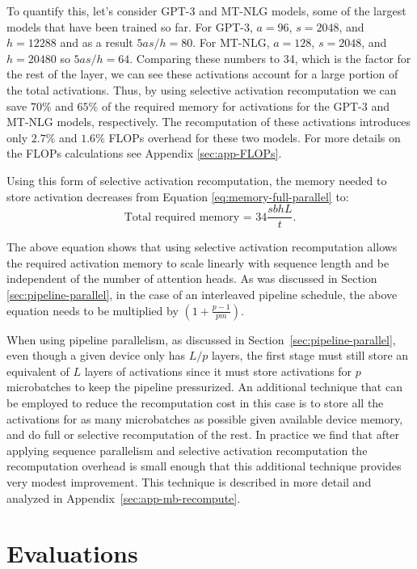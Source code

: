 \documentclass{article}
\begin{document}
To quantify this, let's consider GPT-3 \cite{gpt-3} and MT-NLG \cite{mt-nlg} models, some of the largest models that have been trained so far. For GPT-3, $a=96$, $s=2048$, and $h=12288$ and as a result $5as/h=80$. For MT-NLG, $a=128$, $s=2048$, and $h=20480$ so $5as/h=64$. Comparing these numbers to 34, which is the factor for the rest of the layer, we can see these activations account for a large portion of the total activations. Thus, by using selective activation recomputation we can save $70\%$ and $65\%$ of the required memory for activations for the GPT-3 and MT-NLG models, respectively. The recomputation of these activations introduces only $2.7\%$ and $1.6\%$ FLOPs overhead for these two models. For more details on the FLOPs calculations see Appendix \ref{sec:app-FLOPs}.

Using this form of selective activation recomputation, the memory needed to store activation decreases from Equation \ref{eq:memory-full-parallel} to:
\begin{equation}
     \text{Total required memory = } 34\frac{sbhL}{t}.
    \label{eq:memory-full-parallel-partial}
\end{equation}

The above equation shows that using selective activation recomputation allows the required activation memory to scale linearly with sequence length and be independent of the number of attention heads. As was discussed in Section \ref{sec:pipeline-parallel}, in the case of an interleaved pipeline schedule, the above equation needs to be multiplied by $(1+\frac{p-1}{pm})$. 

When using pipeline parallelism, as discussed in Section~\ref{sec:pipeline-parallel}, even though a given device only has $L/p$ layers, the first stage must still store an equivalent of $L$ layers of activations since it must store activations for $p$ microbatches to keep the pipeline pressurized. An additional technique that can be employed to reduce the recomputation cost in this case is to store all the activations for as many microbatches as possible given available device memory, and do full or selective recomputation of the rest. In practice we find that after applying sequence parallelism and selective activation recomputation the recomputation overhead is small enough that this additional technique provides very modest improvement. This technique is described in more detail and analyzed in Appendix~\ref{sec:app-mb-recompute}.

\section{Evaluations}
\label{sec:evaluations}
\end{document}
